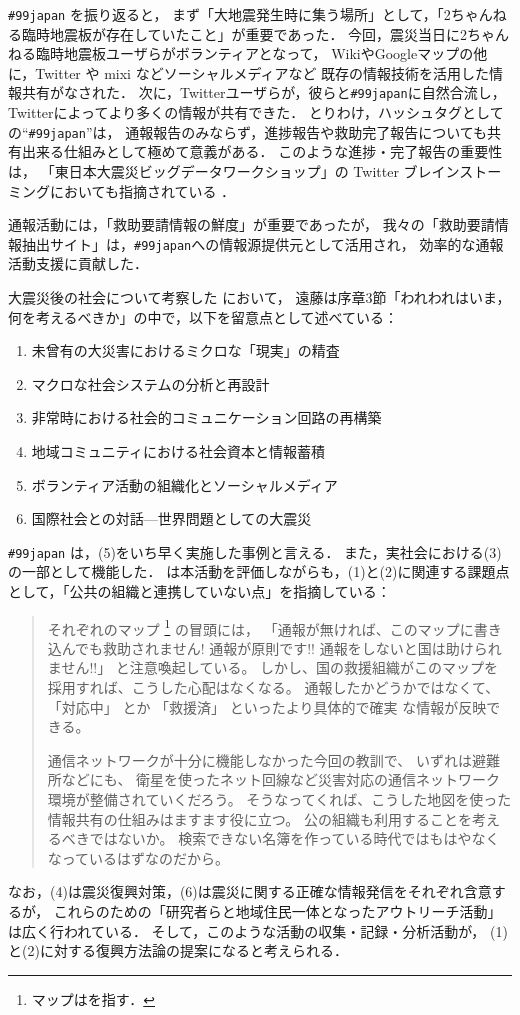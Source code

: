 \documentclass[japanese]{jnlp_1.4}
\begin{document}
{\tt \#99japan} を振り返ると，
まず「大地震発生時に集う場所」として，「2ちゃんねる臨時地震板が存在していたこと」が重要であった．
今回，震災当日に2ちゃんねる臨時地震板ユーザらがボランティアとなって，
WikiやGoogleマップの他に，Twitter や mixi などソーシャルメディアなど
既存の情報技術を活用した情報共有がなされた．
次に，Twitterユーザらが，彼らと{\tt \#99japan}に自然合流し，
Twitterによってより多くの情報が共有できた．
とりわけ，ハッシュタグとしての``{\tt \#99japan}''は，
通報報告のみならず，進捗報告や救助完了報告についても共有出来る仕組みとして極めて意義がある．
このような進捗・完了報告の重要性は，
「東日本大震災ビッグデータワークショップ」の Twitter ブレインストーミングにおいても指摘されている
．

通報活動には，「救助要請情報の鮮度」が重要であったが，
我々の「救助要請情報抽出サイト」は，{\tt \#99japan}への情報源提供元として活用され，
効率的な通報活動支援に貢献した．

大震災後の社会について考察した \cite{Endo} において，
遠藤は序章3節「われわれはいま，何を考えるべきか」の中で，以下を留意点として述べている：
\begin{enumerate}
\item 未曾有の大災害におけるミクロな「現実」の精査
\item マクロな社会システムの分析と再設計
\item 非常時における社会的コミュニケーション回路の再構築
\item 地域コミュニティにおける社会資本と情報蓄積
\item ボランティア活動の組織化とソーシャルメディア
\item 国際社会との対話—世界問題としての大震災
\end{enumerate}
{\tt \#99japan} は，(5)をいち早く実施した事例と言える．
また，実社会における(3)の一部として機能した．
\cite{Utada} は本活動を評価しながらも，(1)と(2)に関連する課題点として，「公共の組織と連携していない点」を指摘している：
\begin{quote}
  それぞれのマップ
  \footnote{
    マップは\cite{map1,map2}を指す．
  }
  の冒頭には，
  「通報が無ければ、このマップに書き込んでも救助されません!
  通報が原則です!!
  通報をしないと国は助けられません!!」
  と注意喚起している。
  しかし、国の救援組織がこのマップを採用すれば、こうした心配はなくなる。
  通報したかどうかではなくて、 
  「対応中」 とか 「救援済」 といったより具体的で確実
  な情報が反映できる。 

  通信ネットワークが十分に機能しなかった今回の教訓で、
  いずれは避難所などにも、
  衛星を使ったネット回線など災害対応の通信ネットワーク環境が整備されていくだろう。
  そうなってくれば、こうした地図を使った情報共有の仕組みはますます役に立つ。
  公の組織も利用することを考えるべきではないか。
  検索できない名簿を作っている時代ではもはやなくなっているはずなのだから。 
\end{quote}
なお，(4)は震災復興対策，(6)は震災に関する正確な情報発信をそれぞれ含意するが，
これらのための「研究者らと地域住民一体となったアウトリーチ活動」は広く行われている．
そして，このような活動の収集・記録・分析活動が，
(1)と(2)に対する復興方法論の提案になると考えられる．
\end{document}
